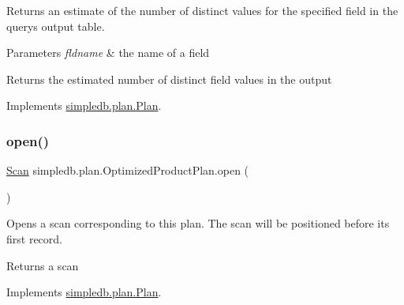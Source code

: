 Returns an estimate of the number of distinct values for the specified field in the query\textquotesingle{}s output table. 
\begin{DoxyParams}{Parameters}
{\em fldname} & the name of a field \\
\hline
\end{DoxyParams}
\begin{DoxyReturn}{Returns}
the estimated number of distinct field values in the output 
\end{DoxyReturn}


Implements \hyperlink{interfacesimpledb_1_1plan_1_1Plan_a55094c16c756b0c09b5c71b94d573271}{simpledb.\+plan.\+Plan}.

\mbox{\label{classsimpledb_1_1plan_1_1OptimizedProductPlan_a885a442c4708535114b8e7a8b022a5f7}} 
\subsubsection{\texorpdfstring{open()}{open()}}
{\footnotesize\ttfamily \hyperlink{interfacesimpledb_1_1query_1_1Scan}{Scan} simpledb.\+plan.\+Optimized\+Product\+Plan.\+open (\begin{DoxyParamCaption}{ }\end{DoxyParamCaption})\hspace{0.3cm}{\ttfamily [inline]}}

Opens a scan corresponding to this plan. The scan will be positioned before its first record. \begin{DoxyReturn}{Returns}
a scan 
\end{DoxyReturn}


Implements \hyperlink{interfacesimpledb_1_1plan_1_1Plan_aaa4c15cda4e9c0d52308850f9f13ff99}{simpledb.\+plan.\+Plan}.

\mbox{\label{classsimpledb_1_1plan_1_1OptimizedProductPlan_acf3d4c379376683928f83fa56de38d60}} 
